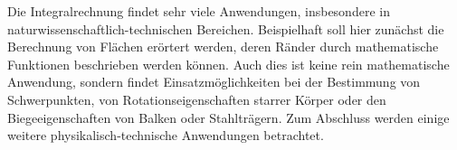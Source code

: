 
\begin{MIntro}
Die Integralrechnung findet sehr viele Anwendungen, insbesondere in 
naturwissenschaftlich-technischen Bereichen. Beispielhaft soll hier zunächst 
die Berechnung von Flächen erörtert werden, deren Ränder durch mathematische 
Funktionen beschrieben werden können. Auch dies ist keine rein mathematische 
Anwendung, sondern findet Einsatzmöglichkeiten bei der Bestimmung von 
Schwerpunkten, von Rotationseigenschaften starrer Körper oder den 
Biegeeigenschaften von Balken oder Stahlträgern. Zum Abschluss werden einige 
weitere physikalisch-technische Anwendungen betrachtet.
\end{MIntro}


